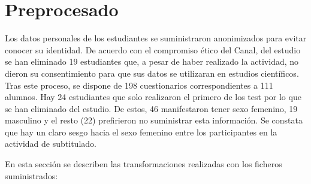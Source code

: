 \documentclass[
  12pt,
  a4paper,
  extrafontsizes,
  onecolumn,
  openright,
  table]{memoir}
\begin{document}
\hypertarget{sec-preprocesado}{%
\section{Preprocesado}\label{sec-preprocesado}}

Los datos personales de los estudiantes se suministraron anonimizados
para evitar conocer su identidad. De acuerdo con el compromiso ético del
Canal, del estudio se han eliminado 19 estudiantes que, a pesar de haber
realizado la actividad, no dieron su consentimiento para que sus datos
se utilizaran en estudios científicos. Tras este proceso, se dispone de
198 cuestionarios correspondientes a 111 alumnos. Hay 24 estudiantes que
solo realizaron el primero de los test por lo que se han eliminado del
estudio. De estos, 46 manifestaron tener sexo femenino, 19 masculino y
el resto (22) prefirieron no suministrar esta información. Se constata
que hay un claro sesgo hacia el sexo femenino entre los participantes en
la actividad de subtitulado.

En esta sección se describen las transformaciones realizadas con los
ficheros suministrados:
\end{document}
